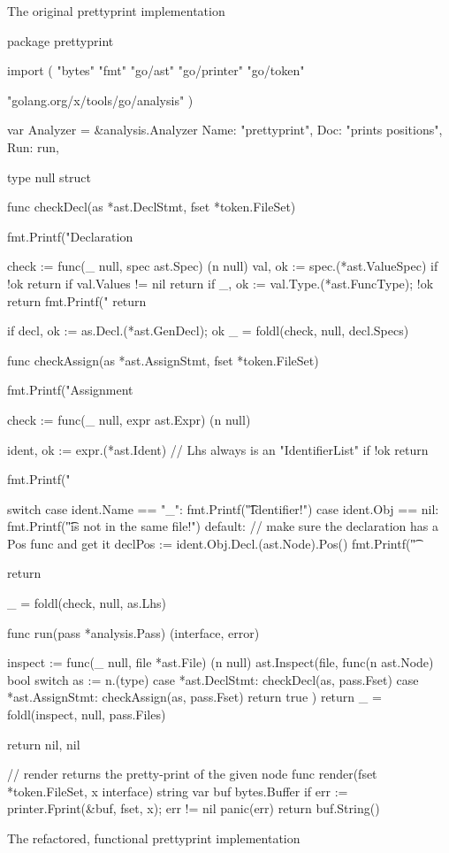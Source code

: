 \begin{code}
	\caption{The original prettyprint implementation}
\end{code}
\begin{code}
	\begin{gocode}
package prettyprint

import (
	"bytes"
	"fmt"
	"go/ast"
	"go/printer"
	"go/token"

	"golang.org/x/tools/go/analysis"
)

var Analyzer = &analysis.Analyzer{
	Name: "prettyprint",
	Doc:  "prints positions",
	Run:  run,
}

type null struct{}

func checkDecl(as *ast.DeclStmt, fset *token.FileSet) {
	fmt.Printf("Declaration %

	check := func(_ null, spec ast.Spec) (n null) {
		val, ok := spec.(*ast.ValueSpec)
		if !ok {
			return
		}
		if val.Values != nil {
			return
		}
		if _, ok := val.Type.(*ast.FuncType); !ok {
			return
		}
		fmt.Printf("\tIdent %
		return
	}

	if decl, ok := as.Decl.(*ast.GenDecl); ok {
		_ = foldl(check, null{}, decl.Specs)
	}
}

func checkAssign(as *ast.AssignStmt, fset *token.FileSet) {
	fmt.Printf("Assignment %

	check := func(_ null, expr ast.Expr) (n null) {
		ident, ok := expr.(*ast.Ident) // Lhs always is an "IdentifierList"
		if !ok {
			return
		}

		fmt.Printf("\tIdent %

		switch {
		case ident.Name == "_":
			fmt.Printf("\t\tBlank Identifier!\n")
		case ident.Obj == nil:
			fmt.Printf("\t\tDecl is not in the same file!\n")
		default:
			// make sure the declaration has a Pos func and get it
			declPos := ident.Obj.Decl.(ast.Node).Pos()
			fmt.Printf("\t\tDecl %
		}

		return
	}
	_ = foldl(check, null{}, as.Lhs)
}

func run(pass *analysis.Pass) (interface{}, error) {
	inspect := func(_ null, file *ast.File) (n null) {
		ast.Inspect(file, func(n ast.Node) bool {
			switch as := n.(type) {
			case *ast.DeclStmt:
				checkDecl(as, pass.Fset)
			case *ast.AssignStmt:
				checkAssign(as, pass.Fset)
			}
			return true
		})
		return
	}
	_ = foldl(inspect, null{}, pass.Files)

	return nil, nil
}

// render returns the pretty-print of the given node
func render(fset *token.FileSet, x interface{}) string {
	var buf bytes.Buffer
	if err := printer.Fprint(&buf, fset, x); err != nil {
		panic(err)
	}
	return buf.String()
}
	\end{gocode}
	\caption{The refactored, functional prettyprint implementation}
\end{code}

